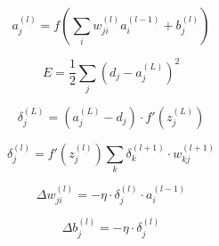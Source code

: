 
\begin{equation}
a^{(l)}_j = f\left( \sum_{i} w^{(l)}_{ji} a^{(l-1)}_i + b^{(l)}_j \right)
\end{equation}

\begin{equation}
E = \frac{1}{2} \sum_{j} \left( d_j - a^{(L)}_j \right)^2
\end{equation}

\begin{equation}
\delta^{(L)}_j = (a^{(L)}_j - d_j) \cdot f' \left( z^{(L)}_j \right)
\end{equation}

\begin{equation}
\boxed{\delta^{(l)}_j = f' \left( z^{(l)}_j \right) \sum_{k} \delta^{(l+1)}_k \cdot w^{(l+1)}_{k j}}
\end{equation}

\begin{equation}
\Delta w^{(l)}_{ji} = -\eta \cdot \delta^{(l)}_j \cdot a^{(l-1)}_i
\end{equation}

\begin{equation}
\Delta b^{(l)}_j = -\eta \cdot \delta^{(l)}_j
\end{equation}